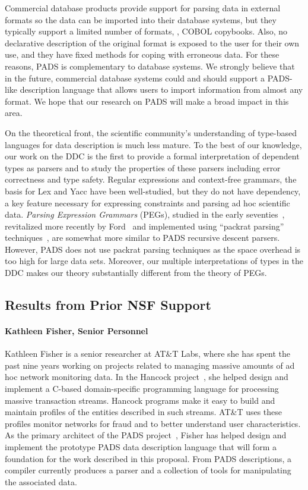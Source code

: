 \documentclass[10pt]{article}
\begin{document}
Commercial database products provide support for
parsing data in external formats so the data can be imported into
their database systems, but they typically support a limited number of
formats, \eg{}, COBOL copybooks.  Also, no declarative description of the
original format is exposed to the user for their own use, and they
have fixed methods for coping with erroneous data.  For these reasons,
PADS is complementary to database systems.  We strongly believe that
in the future, commercial database systems could and should support a 
PADS-like description language that allows users to import information from
almost any format.  We hope that our research on PADS will make a broad
impact in this area.

On the theoretical front, the scientific community's understanding of
type-based languages for data description is much less mature.  To the
best of our knowledge, our work on the DDC is the first to provide a
formal interpretation of dependent types as parsers and to study the
properties of these parsers including error correctness and type
safety.  Regular expressions and context-free grammars, the basis for
Lex and Yacc have been well-studied, but they do not have dependency,
a key feature necessary for expressing constraints and parsing ad hoc
scientific data.  {\em Parsing Expression Grammars} (PEGs), studied in
the early seventies~\cite{birman+:parsing}, revitalized more recently
by Ford~\cite{ford:pegs} and implemented using ``packrat parsing''
techniques~\cite{ford:packrat,grimm:packrat}, are somewhat more
similar to PADS recursive descent parsers. However, PADS does not use
packrat parsing techniques as the space overhead is too high for large
data sets.  Moreover, our multiple interpretations of types
in the DDC makes our theory substantially different from the theory of
PEGs.

\subsection{Results from Prior NSF Support}
\label{ssec:results}

\paragraph*{Kathleen Fisher, Senior Personnel} 
Kathleen Fisher is a senior researcher at AT\&T Labs,
where she has spent the past nine years working on projects
related to managing massive amounts of ad hoc network monitoring data.
In the Hancock project~\cite{kdd00,hancock-toplas}, she helped 
design and implement a C-based
domain-specific programming language for processing massive  
transaction streams.  Hancock programs make it easy to build
and maintain profiles of the entities described in such streams. 
AT\&T uses these profiles monitor networks for fraud 
and to better understand user characteristics.
As the primary architect of the PADS project~\cite{fisher+:pads}, 
Fisher has helped design and implement the prototype PADS
data description language that will form a foundation for the work
described in this proposal.  From PADS descriptions,
a compiler currently produces a parser and a collection of tools for
manipulating the associated data.  
\end{document}

